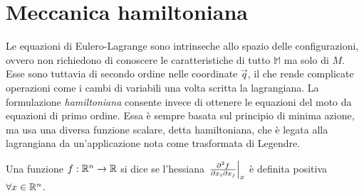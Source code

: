 \section{Meccanica hamiltoniana}
Le equazioni di Eulero-Lagrange sono intrinseche allo spazio delle configurazioni, ovvero non richiedono di conoscere le caratteristiche di tutto $\mathbb{M}$ ma solo di $M$. Esse sono tuttavia di secondo ordine nelle coordinate $\vec{q}$, il che rende complicate operazioni come i cambi di variabili una volta scritta la lagrangiana. La formulazione \emph{hamiltoniana} consente invece di ottenere le equazioni del moto da equazioni di primo ordine. Essa è sempre basata sul principio di minima azione, ma usa una diversa funzione scalare, detta hamiltoniana, che è legata alla lagrangiana da un'applicazione nota come trasformata di Legendre.

\begin{definition}
  Una funzione $f:\mathbb{R}^n \to \mathbb{R}$ si dice  se l'hessiana $\eval{\pdv{f}{x_i}{x_j}}_x$ è definita positiva $\forall x \in \mathbb{R}^{n}$.
\end{definition}

